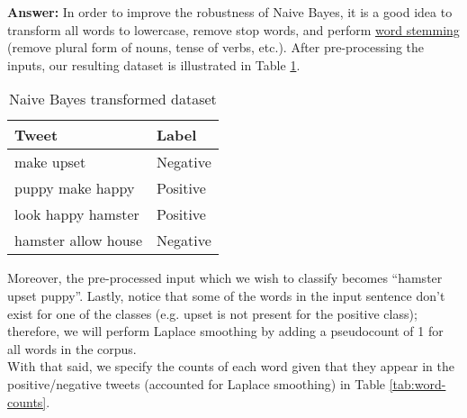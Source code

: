 \documentclass{article}
\newenvironment{QandA}{\begin{enumerate}[label=\arabic*.]}{\end{enumerate}}
\newenvironment{InnerQandA}{\begin{enumerate}[label=\roman*.]}{\end{enumerate}}
\newenvironment{answer}{\par\normalfont \textbf{Answer:}}{}
\begin{document}
\begin{QandA}
\begin{InnerQandA}
        \begin{answer}
        In order to improve the robustness of Naive Bayes, it is a good idea to transform all words to lowercase, remove stop words, and perform \href{https://www.geeksforgeeks.org/python-stemming-words-with-nltk/}{word stemming} (remove plural form of nouns, tense of verbs, etc.). After pre-processing the inputs, our resulting dataset is illustrated in Table \ref{tab:naive-bayes-transformed-dataset}. 
        
        \begin{table}[h!]
        \centering
        \begin{tabular}{|l|l|}
        \hline
        \textbf{Tweet}         & \textbf{Label} \\ \hline
        make upset             & Negative       \\ \hline
        puppy make happy       & Positive       \\ \hline
        look happy hamster     & Positive       \\ \hline
        hamster allow house & Negative       \\ \hline
        \end{tabular}
        \caption{Naive Bayes transformed dataset}
        \label{tab:naive-bayes-transformed-dataset}
        \end{table}
        
        Moreover, the pre-processed input which we wish to classify becomes ``hamster upset puppy''. Lastly, notice that some of the words in the input sentence don't exist for one of the classes (e.g. upset is not present for the positive class); therefore, we will perform Laplace smoothing by adding a pseudocount of 1 for all words in the corpus. \\
        With that said, we specify the counts of each word given that they appear in the positive/negative tweets (accounted for Laplace smoothing) in Table \ref{tab:word-counts}.\\


\end{answer}
\end{InnerQandA}
\end{QandA}
\end{document}
